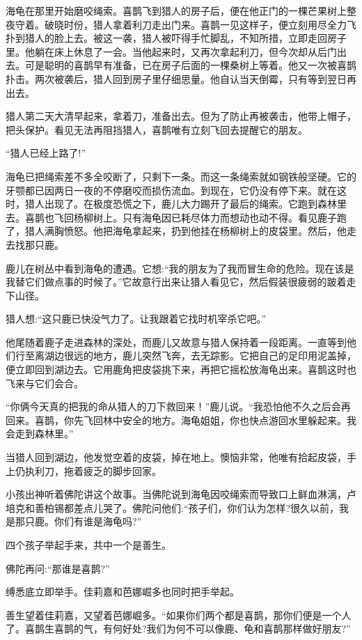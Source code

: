 \documentclass[12pt,twoside,openany]{book}
\begin{document}
海龟在那里开始磨咬绳索。喜鹊飞到猎人的房子后，便在他正门的一棵芒果树上整夜守着。破晓时份，猎人拿着利刀走出门来。喜鹊一见这样子，便立刻用尽全力飞扑到猎人的脸上去。被这一袭，猎人被吓得手忙脚乱，不知所措，立即走回房子里。他躺在床上休息了一会。当他起来时，又再次拿起利刀，但今次却从后门出去。可是聪明的喜鹊早有准备，已在房子后面的一棵桑树上等着。他又一次被喜鹊扑击。两次被袭后，猎人回到房子里仔细思量。他自认当天倒霉，只有等到翌日再出去。

猎人第二天大清早起来，拿着刀，准备出去。但为了防止再被袭击，他带上帽子，把头保护。看见无法再阻挡猎人，喜鹊唯有立刻飞回去提醒它的朋友。

“猎人已经上路了!”

海龟已把绳索差不多全咬断了，只剩下一条。而这一条绳索就如钢铁般坚硬。它的牙颚都已因两日一夜的不停磨咬而损伤流血。到现在，它仍没有停下来。就在这时，猎人出现了。在极度恐慌之下，鹿儿大力踢开了最后的绳索。它跑到森林里去。喜鹊也飞回杨柳树上。只有海龟因已耗尽体力而想动也动不得。看见鹿子跑了，猎人满胸愤怒。他把海龟拿起来，扔到他挂在杨柳树上的皮袋里。然后，他走去找那只鹿。

鹿儿在树丛中看到海龟的遭遇。它想:“我的朋友为了我而冒生命的危险。现在该是我替它们做点事的时候了。”它故意行出来让猎人看见它，然后假装很疲弱的跛着走下山径。

猎人想:“这只鹿已快没气力了。让我跟着它找时机宰杀它吧。”

他尾随着鹿子走进森林的深处，而鹿儿又故意与猎人保持着一段距离。一直等到他们行至离湖边很远的地方，鹿儿突然飞奔，去无踪影。它把自己的足印用泥盖掉，便立即回到湖边去。它用鹿角把皮袋挑下来，再把它摇松放海龟出来。喜鹊这时也飞来与它们会合。

“你俩今天真的把我的命从猎人的刀下救回来！”鹿儿说。“我恐怕他不久之后会再回来。喜鹊，你先飞回林中安全的地方。海龟姐姐，你也快点游回水里躲起来。我会走到森林里。”

当猎人回到湖边，他发觉空着的皮袋，掉在地上。懊恼非常，他唯有拾起皮袋，手上仍执利刀，拖着疲乏的脚步回家。

小孩出神听着佛陀讲这个故事。当佛陀说到海龟因咬绳索而导致口上鲜血淋漓，卢培克和善柏锡都差点儿哭了。佛陀问他们:“孩子们，你们认为怎样?很久以前，我是那只鹿。你们有谁是海龟吗?”

四个孩子举起手来，共中一个是善生。

佛陀再问:“那谁是喜鹊?”

缚悉底立即举手。佳莉嘉和芭娜崛多也同时把手举起。

善生望着佳莉嘉，又望着芭娜崛多。“如果你们两个都是喜鹊，那你们便是一个人了。喜鹊生喜鹊的气，有何好处?我们为何不可以像鹿、龟和喜鹊那样做好朋友?”
\end{document}
